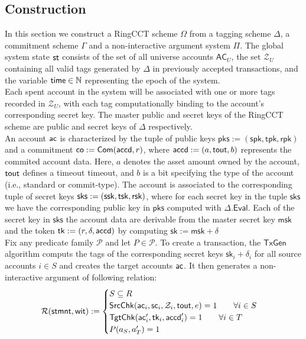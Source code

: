 \subsection{Construction}
In this section we construct a RingCCT scheme $\Omega$ from a tagging scheme $\Delta$, a commitment scheme $\Gamma$ and a non-interactive argument system $\Pi$. The global system state $\st$ consists of the set of all universe accounts $\mathsf{AC}_U$, the set $\mathcal{Z}_U$ containing all valid tags generated by $\Delta$ in previously accepted transactions, and the variable $\mathsf{time} \in \mathbb{N}$ representing the epoch of the system.  \\
Each spent account in the system will be associated with one or more tags recorded in  $\mathcal{Z}_U$, with each tag computationally binding to the account's corresponding secret key. The master public and secret keys of the RingCCT scheme are public and secret keys of $\Delta$ respectively. \\
An account $\mathsf{ac}$ is characterized by the tuple of public keys $\mathsf{pks} := (\mathsf{spk}, \mathsf{tpk}, \mathsf{rpk})$ and a commitment $\mathsf{co} := \mathsf{Com}(\mathsf{accd}, r)$, where $\mathsf{accd} := (a, \mathsf{tout}, b)$ represents the commited account data. Here, $a$ denotes the asset amount owned by the account, $\mathsf{tout}$ defines a timeout timeout, and $b$ is a bit specifying the type of the account (i.e., standard or commit-type). The account is associated to the corresponding tuple of secret keys $\mathsf{sks} := (\mathsf{ssk}, \mathsf{tsk}, \mathsf{rsk})$, where for each secret key in the tuple $\mathsf{sks}$ we have the corresponding public key in $\mathsf{pks}$ computed with  $\Delta.\mathsf{Eval}$. Each of the secret key in $\mathsf{sks}$ the account data are derivable from the master secret key $\mathsf{msk}$ and the token $\mathsf{tk} := (r, \delta, \mathsf{accd})$ by computing $\mathsf{sk} := \mathsf{msk} + \delta$ \\
Fix any predicate family $\mathcal{P}$ and let $P \in \mathcal{P}$. To create a transaction, the $\mathsf{TxGen}$ algorithm computs the tags of the corresponding secret keys $\mathsf{sk}_i + \delta_i$ for all source accounts $i \in S$ and creates the target accounts $\mathsf{ac}$. It then generates a non-interactive argument of following relation:
\begin{equation*}
\mathcal{R}(\mathsf{stmnt}, \mathsf{wit}) := \begin{cases} 
    S \subseteq R \\ 
    \mathsf{SrcChk}(\mathsf{ac}_i, \mathsf{sc}_i, \mathcal{Z}_i, \mathsf{tout}, e) = 1 \qquad \forall i \in S \\ 
    \mathsf{TgtChk}(\mathsf{ac}'_i, \mathsf{tk}_i, \mathsf{accd}'_i) = 1 \qquad \forall i \in T \\ 
    P(a_S, a'_T) = 1
\end{cases}
\end{equation*}
